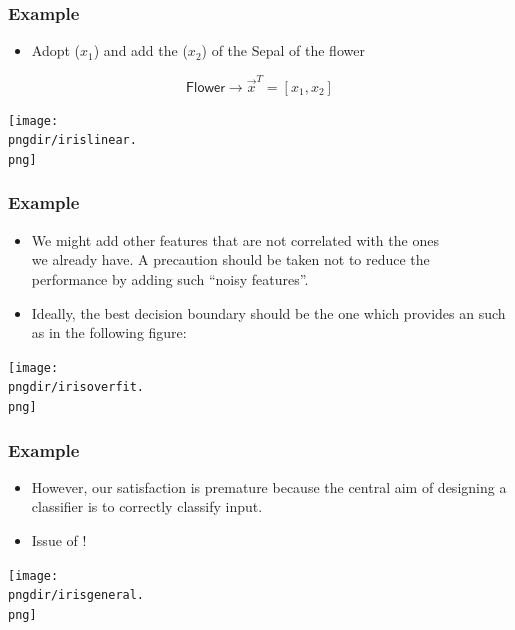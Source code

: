 \begin{frame}
   \frametitle{Example \cont}

   \begin{itemize}
      \item Adopt  ($x_1$) and add the  ($x_2$) of the Sepal of the flower
   \end{itemize}

   \begin{displaymath}
      \mathsf{Flower} \longrightarrow \vec{x}^T = [x_1, x_2]
   \end{displaymath}

   \begin{center}
      \texttt{[image: \\pngdir/irislinear.\\png]}
   \end{center}
\end{frame}


\begin{frame}
   \frametitle{Example \cont}

   \begin{itemize}
      \item We might add other features that are not correlated with the ones \\
        we already have.
        A precaution should be taken not to reduce the \\
        performance by adding such ``noisy features''.
      \item Ideally, the best decision boundary should be the one which provides an  such as in the following figure:
   \end{itemize}

   \begin{center}
      \texttt{[image: \\pngdir/irisoverfit.\\png]}
   \end{center}
\end{frame}


\begin{frame}
   \frametitle{Example \cont}

   \begin{itemize}
      \item However, our satisfaction is premature because the central aim of designing a classifier is to correctly classify  input.\\[.3cm]
      \item Issue of !
   \end{itemize}

   \begin{center}
      \texttt{[image: \\pngdir/irisgeneral.\\png]}
   \end{center}
\end{frame}


